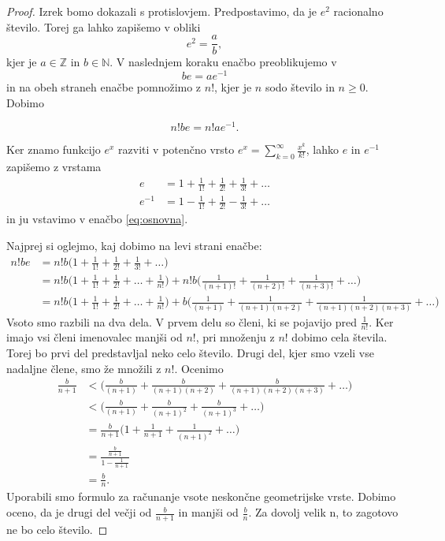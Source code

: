 \documentclass[a4paper]{article}
\theoremstyle{plain}
\begin{document}
\begin{proof}
Izrek bomo dokazali s protislovjem. Predpostavimo, da je $e^2$ racionalno število. Torej ga lahko zapišemo v obliki
\begin{equation*}
e^2 = \frac{a}{b},
\end{equation*}
kjer je $a \in \mathbb{Z}$ in $b \in \mathbb{N}$. V naslednjem koraku enačbo preoblikujemo v 
\begin{equation*}
be = ae^{-1}
\end{equation*}
in na obeh straneh enačbe pomnožimo z $n!$, kjer je $n$ sodo število in $n \ge 0$. Dobimo

\begin{equation}
n!be = n!ae^{-1}.
\label{eq:osnovna}
\end{equation}

Ker znamo funkcijo $e^x$ razviti v potenčno vrsto $\displaystyle e^x = \sum_{k=0}^{\infty}\frac{x^k}{k!}$, lahko $e$ in $e^{-1}$ zapišemo z vrstama
\begin{align*}
e &= 1+\frac{1}{1!}+\frac{1}{2!}+\frac{1}{3!}+\dots \\
e^{-1}&= 1-\frac{1}{1!}+\frac{1}{2!}-\frac{1}{3!}+\dots 
\end{align*}
in ju vstavimo v enačbo \eqref{eq:osnovna}.

Najprej si oglejmo, kaj dobimo na levi strani enačbe:
\begin{align*}
n!be &= n!b \bigg(1+\frac{1}{1!}+\frac{1}{2!}+\frac{1}{3!}+\dots \bigg) \\
&=n!b \bigg(1+\frac{1}{1!}+\frac{1}{2!}+\dots+\frac{1}{n!}\bigg) + n!b \bigg( \frac{1}{(n+1)!}+\frac{1}{(n+2)!}+\frac{1}{(n+3)!}+\dots\bigg)\\
&=n!b \bigg(1+\frac{1}{1!}+\frac{1}{2!}+\dots+\frac{1}{n!}\bigg) + b \bigg( \frac{1}{(n+1)}+\frac{1}{(n+1)(n+2)}+\frac{1}{(n+1)(n+2)(n+3)}+\dots\bigg)
\end{align*}
Vsoto smo razbili na dva dela. V prvem delu so členi, ki se pojavijo pred $\frac{1}{n!}$. Ker imajo vsi členi imenovalec manjši od $n!$, pri množenju z $n!$ dobimo cela števila. Torej bo prvi del predstavljal neko celo število. Drugi del, kjer smo vzeli vse nadaljne člene, smo že množili z $n!$. Ocenimo
\begin{align*}
\frac{b}{n+1} &< \bigg( \frac{b}{(n+1)}+\frac{b}{(n+1)(n+2)}+\frac{b}{(n+1)(n+2)(n+3)}+\dots\bigg) \\
&< \bigg( \frac{b}{(n+1)}+\frac{b}{(n+1)^2}+\frac{b}{(n+1)^3}+\dots\bigg) \\
&= \frac{b}{n+1} \bigg(1+\frac{1}{n+1}+\frac{1}{(n+1)^2}+ \dots\bigg) \\
&= \frac{\frac{b}{n+1}}{1-\frac{1}{n+1}}\\
&= \frac{b}{n}.
\end{align*}
Uporabili smo formulo za računanje vsote neskončne geometrijske vrste. Dobimo oceno, da je drugi del večji od $\frac{b}{n+1}$ in manjši od $\frac{b}{n}$. Za dovolj velik n, to zagotovo ne bo celo število.


\end{proof}
\end{document}
